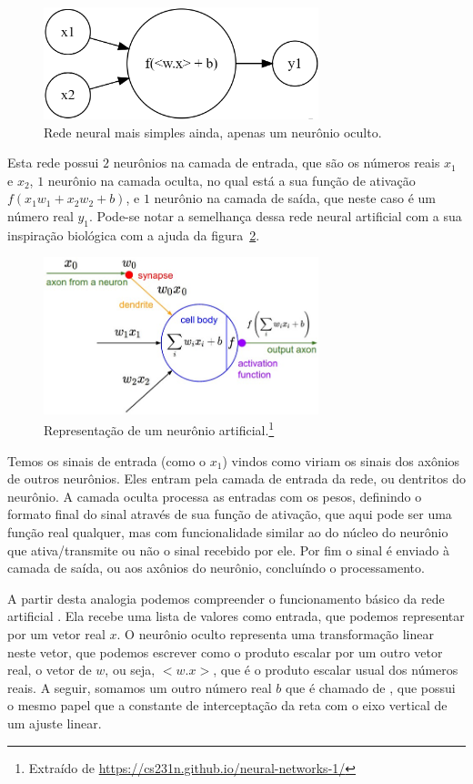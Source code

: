 \begin{figure}[htb]
\centering
\includegraphics[width=8cm]{figuras/neuronio}
\caption{Rede neural mais simples ainda, apenas um neurônio oculto.}
\label{fig:neuronio}
\end{figure}

Esta rede possui $2$ neurônios na camada de entrada, que são os números reais $x_1$ e $x_2$, $1$ neurônio na camada oculta, no qual está a sua função de ativação $f(x_1w_1 + x_2w_2 + b)$, e $1$ neurônio na camada de saída, que neste caso é um número real $y_1$. Pode-se notar a semelhança dessa rede neural artificial com a sua inspiração biológica com a ajuda da figura~\ref{fig:neuron_model}. 

\begin{figure}[htb]
\centering
\includegraphics[width=8cm]{figuras/neuron_model}
\caption{Representação de um neurônio artificial.\footnote{Extraído de \url{https://cs231n.github.io/neural-networks-1/}}}
\label{fig:neuron_model}
\end{figure}

Temos os sinais de entrada (como o $x_1$) vindos como viriam os sinais dos axônios de outros neurônios. Eles entram pela camada de entrada da rede, ou dentritos do neurônio. A camada oculta processa as entradas com os pesos, definindo o formato final do sinal através de sua função de ativação, que aqui pode ser uma função real qualquer, mas com funcionalidade similar ao do núcleo do neurônio que ativa/transmite ou não o sinal recebido por ele. Por fim o sinal é enviado à camada de saída, ou aos axônios do neurônio, concluíndo o processamento.

A partir desta analogia podemos compreender o funcionamento básico da rede artificial . Ela recebe uma lista de valores como entrada, que podemos representar por um vetor real $x$. O neurônio oculto representa uma transformação linear neste vetor, que podemos escrever como o produto escalar por um outro vetor real, o vetor de  $w$, ou seja, $<w.x>$, que é o produto escalar usual dos números reais. A seguir, somamos um outro número real $b$ que é chamado de , que possui o mesmo papel que a constante de interceptação da reta com o eixo vertical de um ajuste linear.

